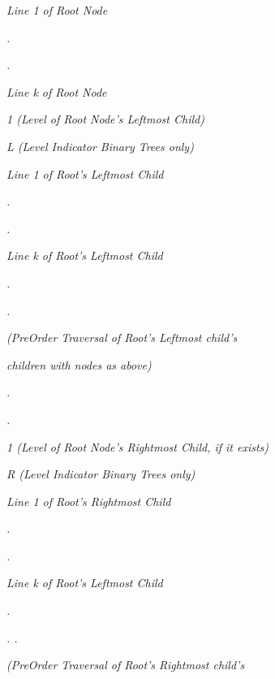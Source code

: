 \documentclass[12pt]{article}
\begin{document}
\textit{{\footnotesize{}                Line 1 of Root Node}}

\textit{{\footnotesize{}                        .}}

\textit{{\footnotesize{}                        .}}

\textit{{\footnotesize{}                        Line k of Root Node}}

\textit{{\footnotesize{}                1  (Level of Root Node's Leftmost Child)}}

\textit{{\footnotesize{}                L  (Level Indicator  Binary Trees only)}}

\textit{{\footnotesize{}                Line 1 of Root's Leftmost Child}}

\textit{{\footnotesize{}                .}}

\textit{{\footnotesize{}                        .}}

\textit{{\footnotesize{}                Line k of Root's Leftmost Child}}

\textit{{\footnotesize{}                        .}}

\textit{{\footnotesize{}                        .}}

\textit{{\footnotesize{}                (PreOrder Traversal of Root's Leftmost child's }}

\textit{{\footnotesize{}         children with nodes as above)}}

\textit{{\footnotesize{}                        .}}

\textit{{\footnotesize{}                        .}}

\textit{{\footnotesize{}                1 (Level of Root Node's Rightmost Child, if it exists) }}

\textit{{\footnotesize{}                R (Level Indicator  Binary Trees only) }}

\textit{{\footnotesize{}                Line 1 of Root's Rightmost Child}}

\textit{{\footnotesize{}                        .}}

\textit{{\footnotesize{}                        .}}

\textit{{\footnotesize{}                Line k of Root's Leftmost Child}}

\textit{{\footnotesize{}                        .}}

\textit{{\footnotesize{}                        .                       .}}

\textit{{\footnotesize{}                (PreOrder Traversal of Root's Rightmost child's }}
\end{document}
